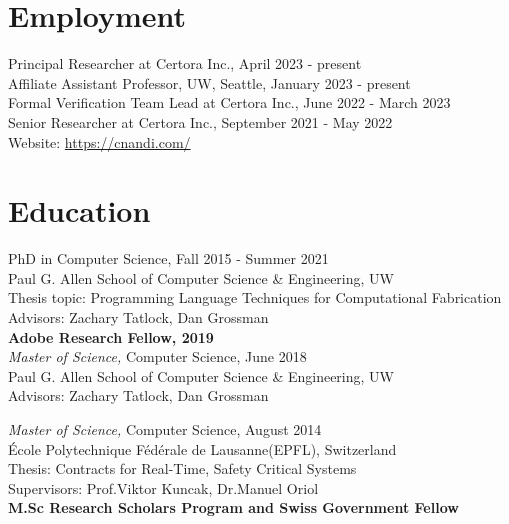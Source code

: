 \documentclass[margin, 10pt]{res} %
\begin{document}
\begin{resume}


\section{Employment}

Principal Researcher at Certora Inc., April 2023 - present \\
Affiliate Assistant Professor, UW, Seattle, January 2023 - present \\

Formal Verification Team Lead at Certora Inc., June 2022 - March 2023 \\
Senior Researcher at Certora Inc., September 2021 - May 2022 \\
Website: \url{https://cnandi.com/} \\

\section{Education}

PhD in Computer Science, Fall 2015 - Summer 2021 \\
Paul G. Allen School of Computer Science \& Engineering, UW \\
Thesis topic: Programming Language Techniques for Computational Fabrication \\
Advisors: Zachary Tatlock, Dan Grossman\\
\textbf{Adobe Research Fellow, 2019} \\

{\sl Master of Science,} Computer Science, June 2018 \\
Paul G. Allen School of Computer Science \& Engineering, UW \\
Advisors: Zachary Tatlock, Dan Grossman

{\sl Master of Science,} Computer Science, August 2014 \\
\'{E}cole Polytechnique F\'{e}d\'{e}rale de Lausanne(EPFL), Switzerland \\
Thesis: Contracts for Real-Time, Safety Critical Systems \\Supervisors: Prof.Viktor Kuncak, Dr.Manuel Oriol\\
\textbf{M.Sc Research Scholars Program and Swiss Government Fellow}


\end{resume}
\end{document}
